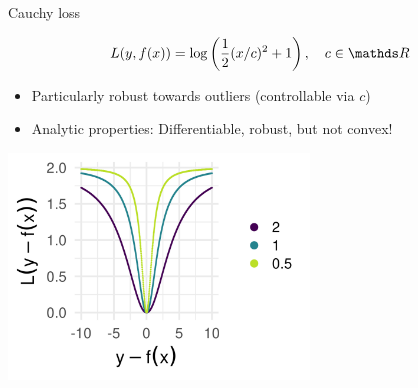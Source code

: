\begin{vbframe}{Cauchy loss}

$$
\Lxy = \log \left(\frac{1}{2} (x / c)^2 + 1\right), \quad c \in \R
$$

\normalsize
\begin{itemize}
\item Particularly robust towards outliers (controllable via $c$)
\item Analytic properties: Differentiable, robust, but not convex! 
\end{itemize}


\begin{center}
\includegraphics[width = 0.6\textwidth]{figure_man/loss_cauchy_plot1.png}
\end{center}

\end{vbframe}



\endlecture

